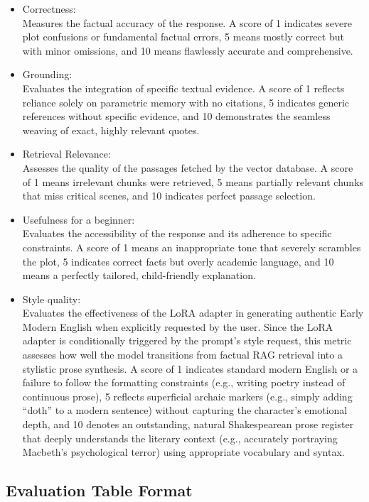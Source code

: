 \documentclass[10pt,conference]{IEEEtran}
\begin{document}
\begin{itemize}
    \item Correctness:\\
    Measures the factual accuracy of the response. A score of 1 indicates severe plot confusions or fundamental factual errors, 5 means mostly correct but with minor omissions, and 10 means flawlessly accurate and comprehensive.
    \item Grounding:\\
    Evaluates the integration of specific textual evidence. A score of 1 reflects reliance solely on parametric memory with no citations, 5 indicates generic references without specific evidence, and 10 demonstrates the seamless weaving of exact, highly relevant quotes.
    \item Retrieval Relevance:\\
    Assesses the quality of the passages fetched by the vector database. A score of 1 means irrelevant chunks were retrieved, 5 means partially relevant chunks that miss critical scenes, and 10 indicates perfect passage selection.
    \item Usefulness for a beginner:\\
    Evaluates the accessibility of the response and its adherence to specific constraints. A score of 1 means an inappropriate tone that severely scrambles the plot, 5 indicates correct facts but overly academic language, and 10 means a 	perfectly tailored, child-friendly explanation.
    \item Style quality:\\
    Evaluates the effectiveness of the LoRA adapter in generating authentic Early Modern English when explicitly requested by the user. Since the LoRA adapter is conditionally 	triggered by the prompt's style request, this metric assesses how 	well the model transitions from factual RAG retrieval into a stylistic prose synthesis. A score of 1 indicates standard modern English or a failure to follow the formatting constraints (e.g., writing poetry instead of continuous prose), 5 reflects superficial archaic markers (e.g., simply adding “doth” to a modern sentence) without capturing the character's emotional depth, and 10 denotes an outstanding, natural Shakespearean prose register that deeply understands the literary context (e.g., accurately portraying Macbeth's psychological terror) using appropriate vocabulary and syntax.
\end{itemize}

\subsection{Evaluation Table Format}
\end{document}
